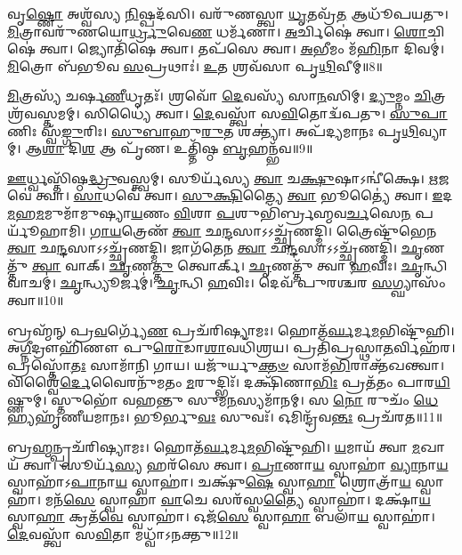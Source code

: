 𑌵𑍃\-\ul{𑌷𑍍𑌣𑍋} 𑌅𑌶𑍍𑌵᳴𑌸𑍍𑌯 \ul{𑌨𑌿}\-𑌷𑍍𑌪𑌦᳴𑌸𑌿। 
𑌵𑌰𑍁᳴𑌣𑌸𑍍𑌤𑍍𑌵𑌾 \ul{𑌧𑍃}\-𑌤𑌵𑍍𑌰᳴\-\ul{𑌤} 𑌆𑌧𑍂᳴𑌪𑌯𑌤𑍁। 
\-\ul{𑌮𑌿}\-𑌤𑍍𑌰𑌾𑌵𑌰𑍁᳴𑌣𑌯𑍋\-\ul{𑌰𑍍𑌧𑍍𑌰𑍁}\-𑌵𑍇\-\ul{𑌣} 𑌧𑌰𑍍𑌮᳴𑌣𑌾। 
\-\ul{𑌅}\-𑌰𑍍𑌚𑌿𑌷𑍇॑ 𑌤𑍍𑌵𑌾। 
\-\ul{𑌶𑍋}\-𑌚𑌿𑌷𑍇॑ 𑌤𑍍𑌵𑌾। 
𑌜𑍍𑌯𑍋𑌤𑌿᳴𑌷𑍇 𑌤𑍍𑌵𑌾। 
𑌤𑌪᳴𑌸𑍇 𑌤𑍍𑌵𑌾। 
\-\ul{𑌅}\-𑌭𑍀𑌮𑌂 𑌮᳴\-\ul{𑌹𑌿}\-𑌨𑌾 𑌦𑌿𑌵𑌮𑍍॑। 
\-\ul{𑌮𑌿}\-𑌤𑍍𑌰𑍋 𑌬᳴𑌭𑍂𑌵 \ul{𑌸}\-𑌪𑍍𑌰𑌥𑌾𑌃॑। 
\-\ul{𑌉}\-𑌤 𑌶𑍍𑌰𑌵᳴𑌸𑌾 𑌪𑍃\-\ul{𑌥𑌿}\-𑌵𑍀𑌮𑍍॥8॥

\-\ul{𑌮𑌿}\-𑌤𑍍𑌰𑌸𑍍𑌯᳴ 𑌚𑌰𑍍\mbox{}𑌷\-\ul{𑌣𑍀}\-𑌧𑍃𑌤𑌃᳴। 
𑌶𑍍𑌰𑌵𑍋᳴ \ul{𑌦𑍇}\-𑌵𑌸𑍍𑌯᳴ 𑌸𑌾\-\ul{𑌨}\-𑌸𑌿𑌮𑍍। 
\-\ul{𑌦𑍍𑌯𑍁}\-𑌮𑍍𑌨𑌂 \ul{𑌚𑌿}\-𑌤𑍍𑌰𑌶𑍍𑌰᳴𑌵𑌸𑍍𑌤𑌮𑌮𑍍। 
𑌸𑌿𑌧𑍍𑌯𑍈॑ 𑌤𑍍𑌵𑌾। 
\-\ul{𑌦𑍇}\-𑌵𑌸𑍍𑌤𑍍𑌵𑌾᳴ 𑌸\-\ul{𑌵𑌿}\-𑌤𑍋𑌦𑍍𑌵᳴𑌪𑌤𑍁। 
\-\ul{𑌸𑍁}\-\-\ul{𑌪𑌾}\-𑌣𑌿𑌃 𑌸𑍍𑌵᳴\-\ul{𑌙𑍍𑌗𑍁}\-𑌰𑌿𑌃। 
\-\ul{𑌸𑍁}\-\-\ul{𑌬𑌾}\-𑌹𑍁\-\ul{𑌰𑍁}\-𑌤 𑌶𑌕𑍍𑌤𑍍𑌯𑌾॑। 
𑌅𑌪᳴𑌦𑍍𑌯𑌮𑌾𑌨𑌃 𑌪𑍃\-\ul{𑌥𑌿}\-𑌵𑍍𑌯𑌾𑌮𑍍। 
𑌆\-\ul{𑌶𑌾} 𑌦𑌿\-\ul{𑌶} 𑌆 𑌪𑍃᳴𑌣। 
𑌉𑌤𑍍𑌤𑌿᳴𑌷𑍍𑌠 \ul{𑌬𑍃}\-𑌹𑌨𑍍𑌭᳴𑌵॥9॥

\-\ul{𑌊}\-𑌰𑍍𑌧𑍍𑌵𑌸𑍍𑌤𑌿᳴𑌷𑍍𑌠\-\ul{𑌦𑍍𑌧𑍍𑌰𑍁}\-𑌵𑌸𑍍𑌤𑍍𑌵𑌮𑍍। 
𑌸𑍂𑌰𑍍𑌯᳴𑌸𑍍𑌯 \ul{𑌤𑍍𑌵𑌾} 𑌚\-\ul{𑌕𑍍𑌷𑍁}\-𑌷𑌾𑌽𑌨𑍍𑌵𑍀॑𑌕𑍍𑌷𑍇। 
\-\ul{𑌋}\-𑌜𑌵𑍇॑ 𑌤𑍍𑌵𑌾। 
\-\ul{𑌸𑌾}\-𑌧𑌵𑍇॑ 𑌤𑍍𑌵𑌾। 
\-\ul{𑌸𑍁}\-\-\ul{𑌕𑍍𑌷𑌿}\-𑌤𑍍𑌯𑍈 \ul{𑌤𑍍𑌵𑌾} 𑌭𑍂𑌤𑍍𑌯𑍈॑ 𑌤𑍍𑌵𑌾। 
\-\ul{𑌇}\-𑌦\-\ul{𑌮}\-𑌹\-\ul{𑌮}\-𑌮𑍁𑌮𑌾᳴\-𑌮𑍁𑌷𑍍𑌯𑌾\-\ul{𑌯}\-𑌣𑌂  \ul{𑌵𑌿}\-𑌶𑌾 \ul{𑌪}\-𑌶𑍁𑌭𑌿᳴𑌰𑍍𑌬𑍍𑌰𑌹𑍍𑌮𑌵\-\ul{𑌰𑍍𑌚}\-𑌸𑍇\-\ul{𑌨} 𑌪𑌰𑍍𑌯𑍂᳴𑌹𑌾𑌮𑌿। 
\-\ul{𑌗𑌾}\-\-\ul{𑌯}\-𑌤𑍍𑌰𑍇𑌣᳴ \ul{𑌤𑍍𑌵𑌾} 𑌛\-\ul{𑌨𑍍𑌦}\-𑌸𑌾𑌽𑌽𑌚𑍍𑌛𑍃᳴𑌣𑌦𑍍𑌮𑌿। 
𑌤𑍍𑌰𑍈𑌷𑍍𑌟𑍁᳴𑌭𑍇𑌨 \ul{𑌤𑍍𑌵𑌾} 𑌛\-\ul{𑌨𑍍𑌦}\-𑌸𑌾𑌽𑌽𑌚𑍍𑌛𑍃᳴𑌣𑌦𑍍𑌮𑌿। 
𑌜𑌾𑌗᳴𑌤𑍇𑌨 \ul{𑌤𑍍𑌵𑌾} 𑌛\-\ul{𑌨𑍍𑌦}\-𑌸𑌾𑌽𑌽𑌚𑍍𑌛𑍃᳴𑌣𑌦𑍍𑌮𑌿। 
\-\ul{𑌛𑍃}\-𑌣𑌤𑍍𑌤𑍁᳴ \ul{𑌤𑍍𑌵𑌾} 𑌵𑌾𑌕𑍍। 
\-\ul{𑌛𑍃}\-𑌣\-\ul{𑌤𑍍𑌤𑍁} 𑌤𑍍𑌵𑍋𑌰𑍍𑌕𑍍। 
\-\ul{𑌛𑍃}\-𑌣𑌤𑍍𑌤𑍁᳴ 𑌤𑍍𑌵𑌾 \ul{𑌹}\-𑌵𑌿𑌃। 
\-\ul{𑌛𑍃}\-𑌨𑍍𑌧𑌿 𑌵𑌾𑌚𑌮𑍍॑। 
\-\ul{𑌛𑍃}\-𑌨𑍍𑌧𑍍𑌯𑍂𑌰𑍍𑌜𑌮𑍍॑। 
\-\ul{𑌛𑍃}\-𑌨𑍍𑌧𑌿 \ul{𑌹}\-𑌵𑌿𑌃। 
𑌦𑍇𑌵᳴ 𑌪𑍁𑌰𑌶𑍍𑌚𑌰 \ul{𑌸}\-𑌗𑍍𑌘𑍍𑌯𑌾𑌸𑌂᳴ 𑌤𑍍𑌵𑌾॥10॥
\anuvakamend[\-\ul{𑌪𑍃}\-\-\ul{𑌥𑌿}\-𑌵𑍀𑌂 𑌭᳴\-\ul{𑌵} 𑌵𑌾𑌖𑍍𑌷𑌟𑍍𑌚᳴]

𑌬𑍍𑌰𑌹𑍍𑌮᳴𑌨𑍍 𑌪𑍍𑌰\-\ul{𑌵}\-𑌰𑍍𑌗𑍍𑌯𑍇᳴\-\ul{𑌣} 𑌪𑍍𑌰𑌚᳴𑌰𑌿𑌷𑍍𑌯𑌾𑌮𑌃। 
𑌹𑍋𑌤᳴\-\ul{𑌰𑍍𑌘}\-𑌰𑍍𑌮\-\ul{𑌮}\-𑌭𑌿𑌷𑍍𑌟𑍁᳴𑌹𑌿। 
𑌅\-\ul{𑌗𑍍𑌨𑍀}\-𑌦𑍍𑌰𑍗𑌹𑌿᳴𑌣𑍗 𑌪𑍁\-\ul{𑌰𑍋}\-𑌡𑌾\-\ul{𑌶𑌾}\-𑌵𑌧𑌿᳴𑌶𑍍𑌰𑌯। 
𑌪𑍍𑌰𑌤𑌿᳴𑌪𑍍𑌰𑌸𑍍𑌥𑌾\-\ul{𑌤}\-𑌰𑍍𑌵𑌿𑌹᳴𑌰। 
𑌪𑍍𑌰𑌸𑍍𑌤𑍋᳴\-\ul{𑌤𑌃} 𑌸𑌾𑌮𑌾᳴𑌨𑌿 𑌗𑌾𑌯। 
𑌯𑌜𑍁᳴𑌰𑍍\mbox{}𑌯𑍁\-\ul{𑌕𑍍𑌤}\-\-\ul{𑍞} 𑌸𑌾𑌮᳴\-\ul{𑌭𑌿}\-𑌰𑌾𑌕𑍍𑌤᳴𑌖𑌨𑍍𑌤𑍍𑌵𑌾। 
𑌵𑌿𑌶𑍍𑌵𑍈॑\-\ul{𑌰𑍍𑌦𑍇}\-𑌵𑍈𑌰𑌨𑍁᳴𑌮𑌤𑌂 \ul{𑌮}\-𑌰𑍁𑌦𑍍𑌭𑌿𑌃᳴। 
𑌦𑌕𑍍𑌷𑌿᳴𑌣𑌾\-\ul{𑌭𑌿𑌃} 𑌪𑍍𑌰𑌤᳴𑌤𑌂 𑌪𑌾𑌰\-\ul{𑌯𑌿}\-𑌷𑍍𑌣𑍁𑌮𑍍। 
𑌸𑍍𑌤𑍁𑌭𑍋᳴ 𑌵𑌹𑌨𑍍𑌤𑍁 𑌸𑍁𑌮\-\ul{𑌨}\-𑌸𑍍𑌯𑌮𑌾᳴𑌨𑌮𑍍। 
𑌸 \ul{𑌨𑍋} 𑌰𑍁𑌚𑌂᳴ \ul{𑌧𑍇}\-𑌹𑍍𑌯𑌹𑍃᳴𑌣𑍀𑌯𑌮𑌾𑌨𑌃। 
𑌭𑍂𑌰𑍍𑌭𑍁\-\ul{𑌵𑌃} 𑌸𑍁𑌵𑌃᳴। 
𑌓𑌮𑌿𑌨𑍍𑌦𑍍𑌰᳴𑌵\-\ul{𑌨𑍍𑌤𑌃} 𑌪𑍍𑌰𑌚᳴𑌰𑌤॥11॥%
\anuvakamend[𑌅𑌹𑍃᳴𑌣𑍀𑌯𑌮𑌾\-\ul{𑌨𑍋} 𑌦𑍍𑌵𑍇 𑌚᳴]

𑌬𑍍𑌰\-\ul{𑌹𑍍𑌮}\-𑌨𑍍𑌪𑍍𑌰𑌚᳴𑌰𑌿𑌷𑍍𑌯𑌾𑌮𑌃। 
𑌹𑍋𑌤᳴\-\ul{𑌰𑍍𑌘}\-𑌰𑍍𑌮\-\ul{𑌮}\-𑌭𑌿𑌷𑍍𑌟𑍁᳴𑌹𑌿। 
\-\ul{𑌯}\-𑌮𑌾𑌯᳴ 𑌤𑍍𑌵𑌾 \ul{𑌮}\-𑌖𑌾𑌯᳴ 𑌤𑍍𑌵𑌾। 
𑌸𑍂𑌰𑍍𑌯᳴\-\ul{𑌸𑍍𑌯} 𑌹𑌰᳴𑌸𑍇 𑌤𑍍𑌵𑌾। 
\-\ul{𑌪𑍍𑌰𑌾}\-𑌣𑌾\-\ul{𑌯} 𑌸𑍍𑌵𑌾𑌹𑌾॑ \ul{𑌵𑍍𑌯𑌾}\-𑌨𑌾\-\ul{𑌯} 𑌸𑍍𑌵𑌾𑌹𑌾᳴𑌽\-\ul{𑌪𑌾}\-𑌨𑌾\-\ul{𑌯} 𑌸𑍍𑌵𑌾𑌹𑌾॑। 
𑌚𑌕𑍍𑌷𑍁᳴\-\ul{𑌷𑍇} 𑌸𑍍𑌵𑌾\-\ul{𑌹𑌾} 𑌶𑍍𑌰𑍋𑌤𑍍𑌰𑌾᳴\-\ul{𑌯} 𑌸𑍍𑌵𑌾𑌹𑌾॑। 
𑌮𑌨᳴\-\ul{𑌸𑍇} 𑌸𑍍𑌵𑌾𑌹𑌾᳴ \ul{𑌵𑌾}\-𑌚𑍇 𑌸𑌰᳴𑌸𑍍𑌵\-\ul{𑌤𑍍𑌯𑍈} 𑌸𑍍𑌵𑌾𑌹𑌾॑। 
𑌦𑌕𑍍𑌷𑌾᳴\-\ul{𑌯} 𑌸𑍍𑌵𑌾\-\ul{𑌹𑌾} 𑌕𑍍𑌰𑌤᳴\-\ul{𑌵𑍇} 𑌸𑍍𑌵𑌾𑌹𑌾॑। 
𑌓𑌜᳴\-\ul{𑌸𑍇} 𑌸𑍍𑌵𑌾\-\ul{𑌹𑌾} 𑌬𑌲𑌾᳴\-\ul{𑌯} 𑌸𑍍𑌵𑌾𑌹𑌾॑। 
\-\ul{𑌦𑍇}\-𑌵𑌸𑍍𑌤𑍍𑌵𑌾᳴ 𑌸\-\ul{𑌵𑌿}\-𑌤𑌾 𑌮𑌧𑍍𑌵𑌾᳴𑌽𑌨𑌕𑍍𑌤𑍁॥12॥

